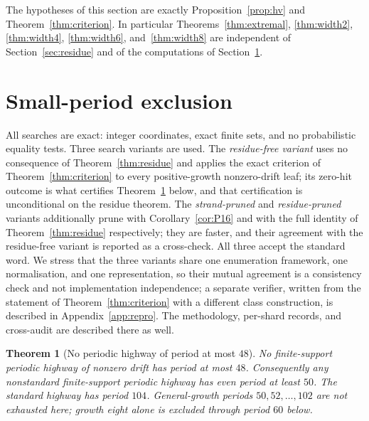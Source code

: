 \documentclass[11pt,letterpaper]{article}
\theoremstyle{plain}
\newtheorem{theorem}{Theorem}[section]
\theoremstyle{definition}
\begin{document}
\begin{NoHyper}
The hypotheses of this section are exactly Proposition~\ref{prop:hv} and
Theorem~\ref{thm:criterion}. In particular Theorems~\ref{thm:extremal},
\ref{thm:width2}, \ref{thm:width4}, \ref{thm:width6}, and~\ref{thm:width8} are independent of
Section~\ref{sec:residue} and of the
computations of Section~\ref{sec:computation}.

\section{Small-period exclusion}\label{sec:computation}

All searches are exact: integer coordinates, exact finite sets, and no probabilistic
equality tests. Three search variants are used. The \emph{residue-free variant} uses no
consequence of Theorem~\ref{thm:residue} and applies the exact criterion of
Theorem~\ref{thm:criterion} to every positive-growth nonzero-drift leaf; its zero-hit
outcome is what certifies Theorem~\ref{thm:periodexcl} below, and that certification
is unconditional on the residue theorem. The \emph{strand-pruned} and
\emph{residue-pruned} variants additionally prune with Corollary~\ref{cor:P16} and
with the full identity of Theorem~\ref{thm:residue} respectively; they are faster, and
their agreement with the residue-free variant is reported as a cross-check. All three
accept the standard word. We stress that the three variants share one enumeration
framework, one normalisation, and one representation, so their mutual agreement is a
consistency check and not implementation independence; a separate verifier, written
from the statement of Theorem~\ref{thm:criterion} with a different class construction,
is described in Appendix~\ref{app:repro}. The methodology, per-shard records, and
cross-audit are described there as well.

\begin{theorem}[No periodic highway of period at most $48$]\label{thm:periodexcl}
No finite-support periodic highway of nonzero drift has period at most $48$.
Consequently any nonstandard finite-support periodic highway has even period at least
$50$. The standard highway has period $104$. General-growth periods
$50,52,\dots,102$ are not exhausted here; growth eight alone is excluded
through period $60$ below.
\end{theorem}


\end{NoHyper}
\end{document}
